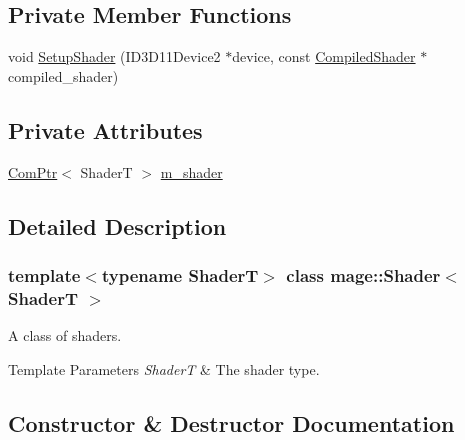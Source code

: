 \subsection*{Private Member Functions}
\begin{DoxyCompactItemize}
\item 
void \hyperlink{classmage_1_1_shader_a833936f38c709a8f898368cb954c2365}{Setup\+Shader} (I\+D3\+D11\+Device2 $\ast$device, const \hyperlink{structmage_1_1_compiled_shader}{Compiled\+Shader} $\ast$compiled\+\_\+shader)
\end{DoxyCompactItemize}
\subsection*{Private Attributes}
\begin{DoxyCompactItemize}
\item 
\hyperlink{namespacemage_ae74f374780900893caa5555d1031fd79}{Com\+Ptr}$<$ ShaderT $>$ \hyperlink{classmage_1_1_shader_aafb44e7a8e55451cf09685d5da4aa7cb}{m\+\_\+shader}
\end{DoxyCompactItemize}


\subsection{Detailed Description}
\subsubsection*{template$<$typename ShaderT$>$\newline
class mage\+::\+Shader$<$ Shader\+T $>$}

A class of shaders.


\begin{DoxyTemplParams}{Template Parameters}
{\em ShaderT} & The shader type. \\
\hline
\end{DoxyTemplParams}


\subsection{Constructor \& Destructor Documentation}
\hypertarget{classmage_1_1_shader_a00051c5ec2185599d8d4fcce23d42aa8}{}\label{classmage_1_1_shader_a00051c5ec2185599d8d4fcce23d42aa8} 

